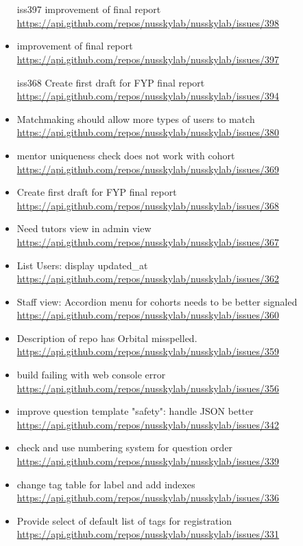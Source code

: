 {\section{}
\begin{itemize}[noitemsep]
    \item [iss397]improvement of final report \url{https://api.github.com/repos/nusskylab/nusskylab/issues/398} 
    \item improvement of final report \url{https://api.github.com/repos/nusskylab/nusskylab/issues/397} 
    \item [iss368]Create first draft for FYP final report \url{https://api.github.com/repos/nusskylab/nusskylab/issues/394} 
    \item Matchmaking should allow more types of users to match \url{https://api.github.com/repos/nusskylab/nusskylab/issues/380} 
    \item mentor uniqueness check does not work with cohort \url{https://api.github.com/repos/nusskylab/nusskylab/issues/369} 
    \item Create first draft for FYP final report \url{https://api.github.com/repos/nusskylab/nusskylab/issues/368} 
    \item Need tutors view in admin view \url{https://api.github.com/repos/nusskylab/nusskylab/issues/367} 
    \item List Users: display updated\_at \url{https://api.github.com/repos/nusskylab/nusskylab/issues/362} 
    \item Staff view: Accordion menu for cohorts needs to be better signaled \url{https://api.github.com/repos/nusskylab/nusskylab/issues/360} 
    \item Description of repo has Orbital misspelled. \url{https://api.github.com/repos/nusskylab/nusskylab/issues/359} 
    \item build failing with web console error \url{https://api.github.com/repos/nusskylab/nusskylab/issues/356} 
    \item improve question template "safety": handle JSON better \url{https://api.github.com/repos/nusskylab/nusskylab/issues/342} 
    \item check and use numbering system for question order \url{https://api.github.com/repos/nusskylab/nusskylab/issues/339} 
    \item change tag table for label and add indexes \url{https://api.github.com/repos/nusskylab/nusskylab/issues/336} 
    \item Provide select of default list of tags for registration \url{https://api.github.com/repos/nusskylab/nusskylab/issues/331} 

\end{itemize}}
